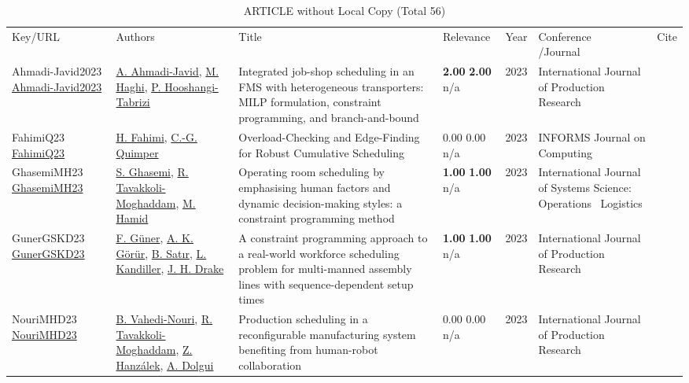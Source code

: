 {\scriptsize
\begin{longtable}{p{3cm}p{5cm}p{10cm}p{1cm}rp{2.5cm}l}
\rowcolor{white}\caption{ARTICLE without Local Copy (Total 56)}\\ \toprule
\rowcolor{white}Key/URL & Authors & Title & Relevance &Year & \shortstack{Conference\\/Journal} & Cite\\ \midrule
\endhead
\bottomrule
\endfoot
Ahmadi-Javid2023 \href{http://dx.doi.org/10.1080/00207543.2023.2230489}{Ahmadi-Javid2023} & \hyperref[auth:a1759]{A. Ahmadi-Javid}, \hyperref[auth:a1760]{M. Haghi}, \hyperref[auth:a1761]{P. Hooshangi-Tabrizi} & Integrated job-shop scheduling in an FMS with heterogeneous transporters: MILP formulation, constraint programming, and branch-and-bound & \noindent{}\textbf{2.00} \textbf{2.00} n/a & 2023 & \cellcolor{red!20}International Journal of Production Research & \cite{Ahmadi-Javid2023}\\
FahimiQ23 \href{http://dx.doi.org/10.1287/ijoc.2021.0138}{FahimiQ23} & \hyperref[auth:a122]{H. Fahimi}, \hyperref[auth:a37]{C.-G. Quimper} & Overload-Checking and Edge-Finding for Robust Cumulative Scheduling & \noindent{}\textcolor{black!50}{0.00} \textcolor{black!50}{0.00} n/a & 2023 & \cellcolor{red!20}INFORMS Journal on Computing & \cite{FahimiQ23}\\
GhasemiMH23 \href{http://dx.doi.org/10.1080/23302674.2023.2224509}{GhasemiMH23} & \hyperref[auth:a980]{S. Ghasemi}, \hyperref[auth:a429]{R. Tavakkoli-Moghaddam}, \hyperref[auth:a981]{M. Hamid} & Operating room scheduling by emphasising human factors and dynamic decision-making styles: a constraint programming method & \noindent{}\textbf{1.00} \textbf{1.00} n/a & 2023 & \cellcolor{red!20}International Journal of Systems Science: Operations \  Logistics & \cite{GhasemiMH23}\\
GunerGSKD23 \href{http://dx.doi.org/10.1080/00207543.2023.2226772}{GunerGSKD23} & \hyperref[auth:a1425]{F. G\"{u}ner}, \hyperref[auth:a1426]{A. K. G\"{o}r\"{u}r}, \hyperref[auth:a1427]{B. Satır}, \hyperref[auth:a1428]{L. Kandiller}, \hyperref[auth:a1429]{J. H. Drake} & A constraint programming approach to a real-world workforce scheduling problem for multi-manned assembly lines with sequence-dependent setup times & \noindent{}\textbf{1.00} \textbf{1.00} n/a & 2023 & \cellcolor{red!20}International Journal of Production Research & \cite{GunerGSKD23}\\
NouriMHD23 \href{http://dx.doi.org/10.1080/00207543.2023.2173503}{NouriMHD23} & \hyperref[auth:a736]{B. Vahedi-Nouri}, \hyperref[auth:a429]{R. Tavakkoli-Moghaddam}, \hyperref[auth:a945]{Z. Hanzálek}, \hyperref[auth:a946]{A. Dolgui} & Production scheduling in a reconfigurable manufacturing system benefiting from human-robot collaboration & \noindent{}\textcolor{black!50}{0.00} \textcolor{black!50}{0.00} n/a & 2023 & \cellcolor{red!20}International Journal of Production Research & \cite{NouriMHD23}\\

\end{longtable}}
